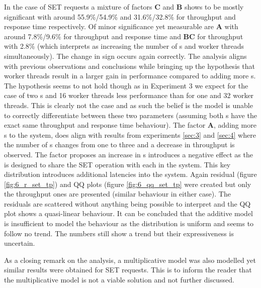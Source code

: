     In the case of SET requests a mixture of factors \textbf{C} and \textbf{B} shows to be mostly significant with
    around 55.9\%/54.9\% and 31.6\%/32.8\% for throughput and response time respectively. Of minor significance yet
    measurable are \textbf{A} with around 7.8\%/9.6\% for throughput and response time and \textbf{BC} for
    throughput with 2.8\% (which interprets as increasing the number of \mw{}s and worker threads simultaneously).
    The change in sign occurs again correctly. The analysis aligns with previous observations and conclusions while
    bringing up the hypothesis that worker threads result in a larger gain in performance compared to adding more
    \mw{}s. The hypothesis seems to not hold though as in Experiment 3 we expect for the case of two \mw{}s and 16
    worker threads less performance than for one \mw{} and 32 worker threads. This is clearly not the case and as
    such the belief is the model is unable to correctly differentiate between these two parameters (assuming both
    \mw{}s have the exact same throughput and response time behaviour). The factor \textbf{A}, adding more \srv{}s to
    the system, does align with results from experiments \ref{sec:3} and \ref{sec:4} where the number of \srv{}s changes
    from one to three and a decrease in throughput is observed. The factor proposes an increase in \srv{}s introduces a
    negative effect as the \mw{} is designed to share the SET operation with each \srv{} in the system. This key
    distribution introduces additional latencies into the system. Again residual (figure \ref{fig:6_r_set_tp}) and QQ
    plots (figure \ref{fig:6_qq_set_tp} were created but only the throughput ones are presented (similar behaviour in
    either case). The residuals are scattered without anything being possible to interpret and the QQ plot shows a
    quasi-linear behaviour. It can be concluded that the additive model is insufficient to model the behaviour as the
    distribution is uniform and seems to follow no trend. The numbers still show a trend but their expressiveness is
    uncertain.

    As a closing remark on the analysis, a multiplicative model was also modelled yet similar results were obtained for
    SET requests. This is to inform the reader that the multiplicative model is not a viable solution and not further
    discussed.


